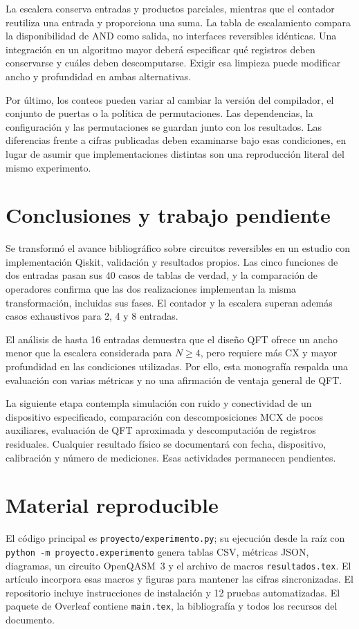 La escalera conserva entradas y productos parciales, mientras que el contador
reutiliza una entrada y proporciona una suma. La tabla de escalamiento
compara la disponibilidad de AND como salida, no interfaces reversibles
idénticas. Una integración en un algoritmo mayor deberá especificar qué
registros deben conservarse y cuáles deben descomputarse. Exigir esa limpieza
puede modificar ancho y profundidad en ambas alternativas.

Por último, los conteos pueden variar al cambiar la versión del compilador,
el conjunto de puertas o la política de permutaciones. Las dependencias,
la configuración y las permutaciones se guardan junto con los resultados.
Las diferencias frente a cifras publicadas deben examinarse bajo esas
condiciones, en lugar de asumir que implementaciones distintas son una
reproducción literal del mismo experimento.

\section{Conclusiones y trabajo pendiente}
Se transformó el avance bibliográfico sobre circuitos reversibles en un
estudio con implementación Qiskit, validación y resultados propios.
Las cinco funciones de dos entradas pasan sus 40 casos de tablas de verdad,
y la comparación de operadores confirma que las dos realizaciones implementan
la misma transformación, incluidas sus fases. El contador y la escalera
superan además \ValidationCases{} casos exhaustivos para 2, 4 y 8 entradas.

El análisis de hasta 16 entradas demuestra que el diseño QFT ofrece un ancho
menor que la escalera considerada para $N\geq4$, pero requiere más CX y mayor profundidad
en las condiciones utilizadas. Por ello, esta monografía respalda una evaluación
con varias métricas y no una afirmación de ventaja general de QFT.

La siguiente etapa contempla simulación con ruido y conectividad de un
dispositivo especificado, comparación con descomposiciones MCX de pocos
auxiliares, evaluación de QFT aproximada y descomputación de registros
residuales. Cualquier resultado físico se documentará con fecha, dispositivo,
calibración y número de mediciones. Esas actividades permanecen pendientes.

\section{Material reproducible}
El código principal es \texttt{proyecto/experimento.py}; su ejecución desde
la raíz con \texttt{python -m proyecto.experimento} genera tablas CSV,
métricas JSON, diagramas, un circuito OpenQASM~3 y el archivo de macros
\texttt{resultados.tex}. El artículo incorpora esas macros y figuras para
mantener las cifras sincronizadas. El repositorio incluye instrucciones de
instalación y 12 pruebas automatizadas. El paquete de Overleaf contiene
\texttt{main.tex}, la bibliografía y todos los recursos del documento.

